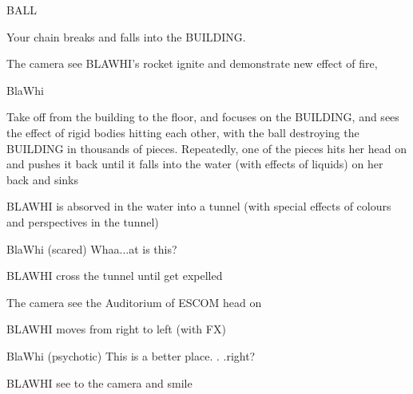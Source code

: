 \documentclass{screenplay}[2012/06/30]
\begin{document}
\begin{dialogue}{BALL}
\end{dialogue}
Your chain breaks and falls into the BUILDING.



The camera see BLAWHI's rocket ignite and demonstrate  new effect of fire, 

\begin{dialogue}{BlaWhi}
\end{dialogue}
Take off from the building to the floor, and
focuses on the BUILDING, and sees the effect of rigid bodies hitting each other, with the ball destroying the BUILDING in thousands of pieces. Repeatedly, one of the pieces hits her head on and pushes it back until it falls into the water (with effects of liquids) on her back and sinks

\textbf{}
BLAWHI is absorved in the water into a tunnel (with special effects of colours and perspectives in the tunnel)

\begin{dialogue}{BlaWhi}
(scared) Whaa...at is this?
\end{dialogue}

BLAWHI cross the tunnel until get expelled

\textbf{}
The camera see the Auditorium of ESCOM head on 

BLAWHI moves from right to left (with FX)


\begin{dialogue}{BlaWhi}
(psychotic) This is a better place. . .right?
\end{dialogue}
BLAWHI  see to the camera and smile
\theend
\end{document}
